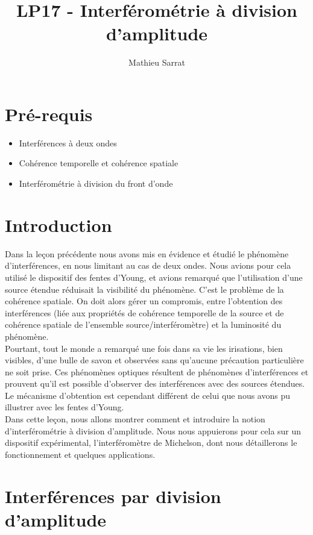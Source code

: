 \documentclass[11pt,a4paper]{report}
\author{Mathieu Sarrat}
\title{LP17 - Interférométrie à division d'amplitude}
\begin{document}
\maketitle

\section*{Pré-requis}
\begin{itemize}
	\item Interférences à deux ondes
	\item Cohérence temporelle et cohérence spatiale
	\item Interférométrie à division du front d'onde
\end{itemize}

\newpage
\section*{Introduction}

Dans la leçon précédente nous avons mis en évidence et étudié le phénomène d'interférences, en nous limitant au cas de deux ondes. Nous avions pour cela utilisé le dispositif des fentes d'Young, et avions remarqué que l'utilisation d'une source étendue réduisait la visibilité du phénomène. C'est le problème de la cohérence spatiale. On doit alors gérer un compromis, entre l'obtention des interférences (liée aux propriétés de cohérence temporelle de la source et de cohérence spatiale de l'ensemble source/interféromètre) et la luminosité du phénomène.\\

Pourtant, tout le monde a remarqué une fois dans sa vie les irisations, bien visibles, d'une bulle de savon et observées sans qu'aucune précaution particulière ne soit prise. Ces phénomènes optiques résultent de phénomènes d'interférences et prouvent qu'il est possible d'observer des interférences avec des sources étendues. Le mécanisme d'obtention est cependant différent de celui que nous avons pu illustrer avec les fentes d'Young.\\

Dans cette leçon, nous allons montrer comment et introduire la notion d'interférométrie à division d'amplitude. Nous nous appuierons pour cela sur un dispositif expérimental, l'interféromètre de Michelson, dont nous détaillerons le fonctionnement et quelques applications.

\section{Interférences par division d'amplitude}
\end{document}
